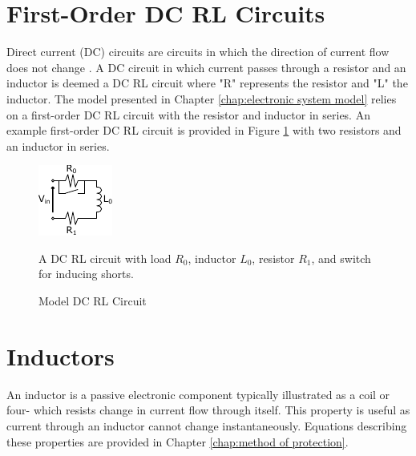 \documentclass[11pt,oneside]{report}
\begin{document}
    \section*{First-Order DC RL Circuits}
    Direct current (DC) circuits are circuits in which the direction of current flow does not change \cite{uniphy}. A DC circuit in which current passes through a resistor and an inductor is deemed a DC RL circuit where "R" represents the resistor and "L" the inductor. The model presented in Chapter \ref{chap:electronic system model} relies on a first-order DC RL circuit with the resistor and inductor in series. An example first-order DC RL circuit is provided in Figure \ref{fig:ModelDCRL} with two resistors and an inductor in series.
    \begin{figure}
        \centering
        \includegraphics[width=0.25\linewidth]{img/Model_DC_RL_Circuit_General.pdf}
        \caption{Model DC RL Circuit} A DC RL circuit with load $R_0$, inductor $L_0$, resistor $R_1$, and switch for inducing shorts.
        \label{fig:ModelDCRL}
    \end{figure}
    \section*{Inductors}
    An inductor is a passive electronic component typically illustrated as a coil or four- which resists change in current flow through itself. This property is useful as current through an inductor cannot change instantaneously. Equations describing these properties are provided in Chapter \ref{chap:method of protection}.
\end{document}
